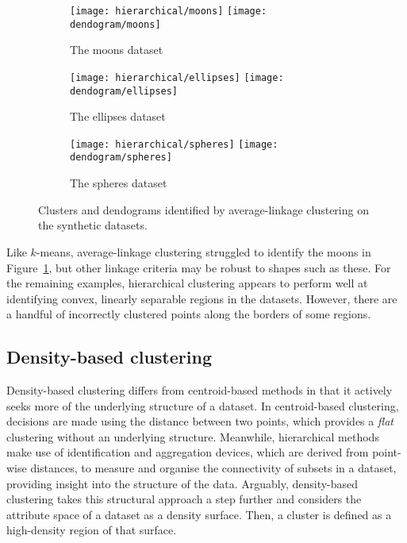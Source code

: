 \begin{figure}
    \centering
    \begin{subfigure}{\textwidth}
        \centering
        \texttt{[image: hierarchical/moons]}
        \texttt{[image: dendogram/moons]}
        \caption{The moons dataset}\label{fig:hierarchical_moons}
    \end{subfigure}

    \begin{subfigure}{\textwidth}
        \centering
        \texttt{[image: hierarchical/ellipses]}
        \texttt{[image: dendogram/ellipses]}
        \caption{The ellipses dataset}\label{fig:hierarchical_ellipses}
    \end{subfigure}%

    \begin{subfigure}{\textwidth}
        \centering
        \texttt{[image: hierarchical/spheres]}
        \texttt{[image: dendogram/spheres]}
        \caption{The spheres dataset}\label{fig:hierarchical_spheres}
    \end{subfigure}
    \caption{%
        Clusters and dendograms identified by average-linkage clustering on the
        synthetic datasets.%
    }\label{fig:hierarchical_examples}
\end{figure}

Like \(k\)-means, average-linkage clustering struggled to identify the moons in
Figure~\ref{fig:hierarchical_moons}, but other linkage criteria may be robust to
shapes such as these. For the remaining examples, hierarchical clustering
appears to perform well at identifying convex, linearly separable regions in the
datasets. However, there are a handful of incorrectly clustered points along the
borders of some regions.

\subsection{Density-based clustering}

Density-based clustering differs from centroid-based methods in that
it actively seeks more of the underlying structure of a dataset. In
centroid-based clustering, decisions are made using the distance between two
points, which provides a \emph{flat} clustering without an underlying structure.
Meanwhile, hierarchical methods make use of identification and aggregation
devices, which are derived from point-wise distances, to measure and organise
the connectivity of subsets in a dataset, providing insight into the structure
of the data. Arguably, density-based clustering takes this structural approach a
step further and considers the attribute space of a dataset as a density
surface. Then, a cluster is defined as a high-density region of that surface.

